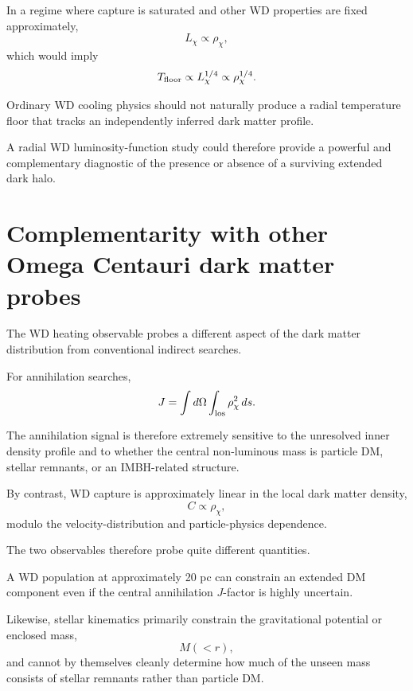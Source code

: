 \documentclass[11pt,a4paper]{article}
\begin{document}
In a regime where capture is saturated and other WD properties are fixed approximately,
\begin{equation}
L_\chi \propto \rho_\chi,
\end{equation}
which would imply
\begin{equation}
T_{\rm floor}
\propto
L_\chi^{1/4}
\propto
\rho_\chi^{1/4}.
\end{equation}

Ordinary WD cooling physics should not naturally produce a radial temperature floor that tracks an independently inferred dark matter profile.

A radial WD luminosity-function study could therefore provide a powerful and complementary diagnostic of the presence or absence of a surviving extended dark halo.


\section{Complementarity with other Omega Centauri dark matter probes}

The WD heating observable probes a different aspect of the dark matter distribution from conventional indirect searches.

For annihilation searches,
\begin{equation}
J
=
\int d\Omega
\int_{\rm los}
\rho_\chi^2\,ds.
\end{equation}

The annihilation signal is therefore extremely sensitive to the unresolved inner density profile and to whether the central non-luminous mass is particle DM, stellar remnants, or an IMBH-related structure.

By contrast, WD capture is approximately linear in the local dark matter density,
\begin{equation}
C\propto\rho_\chi,
\end{equation}
modulo the velocity-distribution and particle-physics dependence.

The two observables therefore probe quite different quantities.

A WD population at approximately 20 pc can constrain an extended DM component even if the central annihilation $J$-factor is highly uncertain.

Likewise, stellar kinematics primarily constrain the gravitational potential or enclosed mass,
\begin{equation}
M(<r),
\end{equation}
and cannot by themselves cleanly determine how much of the unseen mass consists of stellar remnants rather than particle DM.
\end{document}

